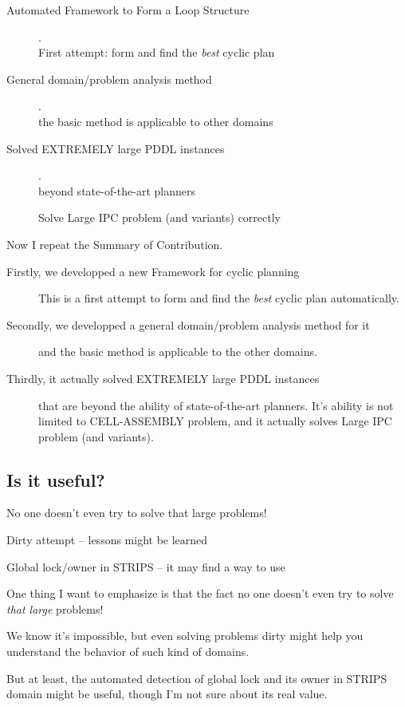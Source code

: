 \begin{description}
\item[{Automated Framework to Form a Loop Structure}] . \\
First attempt: form and find the \emph{best} cyclic plan
\item[{General domain/problem analysis method}] . \\
the basic method is applicable to other domains
\item[{Solved EXTREMELY large PDDL instances}] . \\
beyond state-of-the-art planners

Solve Large IPC problem (and variants) correctly
\end{description}

\begin{resume}
Now I repeat the Summary of Contribution.
\begin{description}
\item[{Firstly, we developped a new Framework for cyclic planning}] This is a first attempt to form and find the \emph{best} cyclic plan automatically.
\item[{Secondly, we developped a general domain/problem analysis method for it}] and the basic method is applicable to the other domains.
\item[{Thirdly, it actually solved EXTREMELY large PDDL instances}] that are beyond the ability of state-of-the-art planners.
It's ability is not limited to CELL-ASSEMBLY problem, and
it actually solves Large IPC problem (and variants).
\end{description}
\end{resume}

\subsection{Is it useful?}
\label{sec-10-1}

No one doesn't even try to solve that large problems!

Dirty attempt -- lessons might be learned

Global lock/owner in STRIPS -- it may find a way to use

\begin{resume}
One thing I want to emphasize is that the fact no one doesn't even try to solve
\emph{that large} problems!

We know it's impossible, but even solving problems dirty
might help you understand the behavior of such kind of domains.

But at least, the automated detection of global lock and its owner in STRIPS domain
might be useful, though I'm not sure about its real value.
\end{resume}

